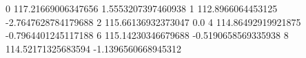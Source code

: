 0 117.21669006347656 1.5553207397460938
1 112.8966064453125 -2.7647628784179688
2 115.66136932373047 0.0
4 114.86492919921875 -0.7964401245117188
6 115.14230346679688 -0.5190658569335938
8 114.52171325683594 -1.1396560668945312
